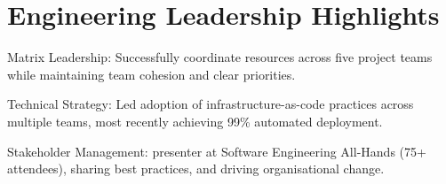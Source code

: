 \section{Engineering Leadership Highlights}
\vspace{0.25em}
\begin{tightemize}
  \item Matrix Leadership: Successfully coordinate resources across five project teams while maintaining team cohesion and clear priorities.
  \item Technical Strategy: Led adoption of infrastructure-as-code practices across multiple teams, most recently achieving 99\% automated deployment.
  \item Stakeholder Management: presenter at Software Engineering All-Hands (75+ attendees), sharing best practices, and driving organisational change.
\end{tightemize}
\sectionsep{}
